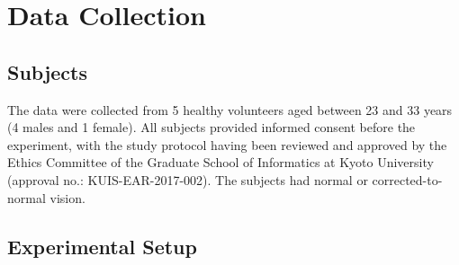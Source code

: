 \section{Data Collection}


\subsection{Subjects}
The data were collected from 5 healthy volunteers aged between 23 and 33 years (4 males and 1 female). All subjects provided informed consent before the experiment, with the study protocol having been reviewed and approved by the Ethics Committee of the Graduate School of Informatics at Kyoto University (approval no.: KUIS{-}EAR{-}2017{-}002). The subjects had normal or corrected-to-normal vision.

\subsection{Experimental Setup}
